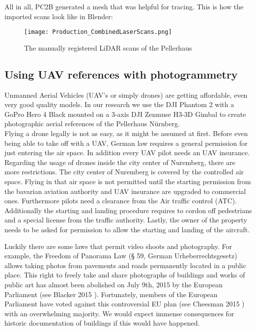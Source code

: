 All in all, PC2B generated a mesh that was helpful for tracing. This is how the imported scans look like in Blender:

\begin{figure}[h]
	\centering
	\texttt{[image: Production\_CombinedLaserScans.png]}
	\caption{The manually registered LiDAR scans of the Pellerhaus}
	\label{fig:production_laser_scans_combined}
\end{figure}




\subsection{Using UAV references with photogrammetry}

Unmanned Aerial Vehicles (UAV's or simply drones) are getting affordable, even very good quality models. In our research we use the DJI Phantom 2 with a GoPro Hero 4 Black mounted on a 3-axis DJI Zenmuse H3-3D Gimbal to create photographic aerial references of the Pellerhaus Nürnberg.\\

Flying a drone legally is not as easy, as it might be assumed at first. Before even being able to take off with a UAV, German law requires a general permission for just entering the air space. In addition every UAV pilot needs an UAV insurance.\\

Regarding the usage of drones inside the city center of Nuremberg, there are more restrictions. The city center of Nuremberg is covered by the controlled air space. Flying in that air space is not permitted until the starting permission from the bavarian aviation authority and UAV insurance are upgraded to commercial ones. Furthermore pilots need a clearance from the Air traffic control (ATC). Additionally the starting and landing procedure requires to cordon off pedestrians and a special license from the traffic authority. Lastly, the owner of the property needs to be asked for permission to allow the starting and landing of the aircraft.\\

\pagebreak

Luckily there are some laws that permit video shoots and photography. For example, the Freedom of Panorama Law (§ 59, German Urheberrechtsgesetz) allows taking photos from pavements and roads permanently located in a public place. This right to freely take and share photographs of buildings and works of public art has almost been abolished on July 9th, 2015 by the European Parliament (see Blacker 2015 \parencite{freedomOfPanoramaUnderAttack}). Fortunately, members of the European Parliament have voted against this controversial EU plan (see Cheesman 2015 \parencite{freedomOfPanoramaSaved}) with an overwhelming majority. We would expect immense consequences for historic documentation of buildings if this would have happened.\\

